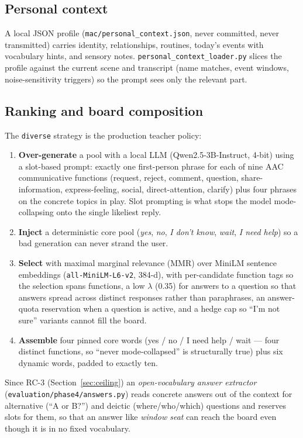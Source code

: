 \documentclass[11pt]{article}
\newcommand{\code}[1]{\texttt{#1}}
\newcommand{\file}[1]{\texttt{\small #1}}
\begin{document}
\subsection{Personal context}
A local JSON profile (\file{mac/personal\_context.json}, never committed, never transmitted) carries identity, relationships, routines, today's events with vocabulary hints, and sensory notes. \file{personal\_context\_loader.py} slices the profile against the current scene and transcript (name matches, event windows, noise-sensitivity triggers) so the prompt sees only the relevant part.

\subsection{Ranking and board composition}
\label{sec:ranking}
The \code{diverse} strategy is the production teacher policy:
\begin{enumerate}
\item \textbf{Over-generate} a pool with a local LLM (Qwen2.5-3B-Instruct, 4-bit) using a slot-based prompt: exactly one first-person phrase for each of nine AAC communicative functions (request, reject, comment, question, share-information, express-feeling, social, direct-attention, clarify) plus four phrases on the concrete topics in play. Slot prompting is what stops the model mode-collapsing onto the single likeliest reply.
\item \textbf{Inject} a deterministic core pool (\emph{yes}, \emph{no}, \emph{I don't know}, \emph{wait}, \emph{I need help}) so a bad generation can never strand the user.
\item \textbf{Select} with maximal marginal relevance (MMR) over MiniLM sentence embeddings (\code{all-MiniLM-L6-v2}, 384-d), with per-candidate function tags so the selection spans functions, a low $\lambda$ (0.35) for answers to a question so that answers spread across distinct responses rather than paraphrases, an answer-quota reservation when a question is active, and a hedge cap so ``I'm not sure'' variants cannot fill the board.
\item \textbf{Assemble} four pinned core words (yes / no / I need help / wait --- four distinct functions, so ``never mode-collapsed'' is structurally true) plus six dynamic words, padded to exactly ten.
\end{enumerate}
Since RC-3 (Section~\ref{sec:ceiling}) an \emph{open-vocabulary answer extractor}
(\file{evaluation/phase4/answers.py}) reads concrete answers out of the context
for alternative (``A or B?'') and deictic (where/who/which) questions and
reserves slots for them, so that an answer like \emph{window seat} can reach the
board even though it is in no fixed vocabulary.
\end{document}
